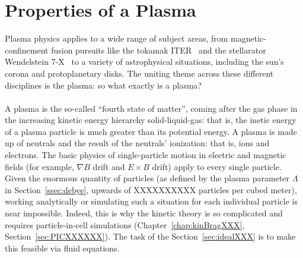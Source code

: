 \section{Properties of a Plasma}
Plasma physics applies to a wide range of subject areas, from magnetic-confinement fusion pursuits like the tokamak ITER~\cite{X} and the stellarator Wendelstein 7-X~\cite{XXX} to a variety of astrophysical situations, including the sun's corona and protoplanetary disks. The uniting theme across these different disciplines is the plasma: so what exactly is a plasma? \\
\\
A plasma is the so-called ``fourth state of matter'', coming after the gas phase in the increasing kinetic energy hierarchy solid-liquid-gas: that is, the inetic energy of a plasma particle is much greater than its potential energy. A plasma is made up of neutrals and the result of the neutrals' ionization: that is, ions and electrons. The basic physics of single-particle motion in electric and magnetic fields (for example, $\nabla B$ drift and $E\times B$ drift) apply to every single particle. Given the enormous quantity of particles (as defined by the plasma parameter $\Lambda$ in Section~\ref{ssec:debye}, upwards of XXXXXXXXXX particles per cubed meter), working analytically or simulating such a situation for each individual particle is near impossible. Indeed, this is why the kinetic theory is so complicated and requires particle-in-cell simulations (Chapter~\ref{chap:kinBragXXX}, Section~\ref{sec:PICXXXXXX}). The task of the Section~\ref{sec:idealXXX} is to make this feasible via fluid equations. 

